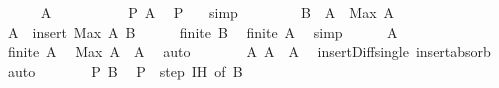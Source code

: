 \begin{isabellebody}
\ \ \ \ \isamarkupfalse%
\ {\isachardoublequoteopen}A\ {\isacharequal}{\kern0pt}\ {\isacharbraceleft}{\kern0pt}{\isacharbraceright}{\kern0pt}{\isachardoublequoteclose}\ \isanewline
\ \ \ \ \isamarkupfalse%
\ \isamarkupfalse%
\ {\isachardoublequoteopen}P\ A{\isachardoublequoteclose}\ \isamarkupfalse%
\ {\isacartoucheopen}P\ {\isacharbraceleft}{\kern0pt}{\isacharbraceright}{\kern0pt}{\isacartoucheclose}\ \isamarkupfalse%
\ simp\isanewline
\ \ \isamarkupfalse%
\isanewline
\ \ \ \ \isamarkupfalse%
\ {\isacharquery}{\kern0pt}B\ {\isacharequal}{\kern0pt}\ {\isachardoublequoteopen}A\ {\isacharminus}{\kern0pt}\ {\isacharbraceleft}{\kern0pt}Max\ A{\isacharbraceright}{\kern0pt}{\isachardoublequoteclose}\ \isanewline
\ \ \ \ \isamarkupfalse%
\ {\isacharquery}{\kern0pt}A\ {\isacharequal}{\kern0pt}\ {\isachardoublequoteopen}insert\ {\isacharparenleft}{\kern0pt}Max\ A{\isacharparenright}{\kern0pt}\ {\isacharquery}{\kern0pt}B{\isachardoublequoteclose}\isanewline
\ \ \ \ \isamarkupfalse%
\ {\isachardoublequoteopen}finite\ {\isacharquery}{\kern0pt}B{\isachardoublequoteclose}\ \isamarkupfalse%
\ {\isacartoucheopen}finite\ A{\isacartoucheclose}\ \isamarkupfalse%
\ simp\isanewline
\ \ \ \ \isamarkupfalse%
\ {\isachardoublequoteopen}A\ {\isasymnoteq}\ {\isacharbraceleft}{\kern0pt}{\isacharbraceright}{\kern0pt}{\isachardoublequoteclose}\isanewline
\ \ \ \ \isamarkupfalse%
\ {\isacartoucheopen}finite\ A{\isacartoucheclose}\ \isamarkupfalse%
\ {\isachardoublequoteopen}Max\ A\ {\isasymin}\ A{\isachardoublequoteclose}\ \isamarkupfalse%
\ auto\isanewline
\ \ \ \ \isamarkupfalse%
\ \isamarkupfalse%
\ A{\isacharcolon}{\kern0pt}\ {\isachardoublequoteopen}{\isacharquery}{\kern0pt}A\ {\isacharequal}{\kern0pt}\ A{\isachardoublequoteclose}\ \isamarkupfalse%
\ insert{\isacharunderscore}{\kern0pt}Diff{\isacharunderscore}{\kern0pt}single\ insert{\isacharunderscore}{\kern0pt}absorb\ \isamarkupfalse%
\ auto\isanewline
\ \ \ \ \isamarkupfalse%
\ \isamarkupfalse%
\ {\isachardoublequoteopen}P\ {\isacharquery}{\kern0pt}B{\isachardoublequoteclose}\ \isamarkupfalse%
\ {\isacartoucheopen}P\ {\isacharbraceleft}{\kern0pt}{\isacharbraceright}{\kern0pt}{\isacartoucheclose}\ step\ IH\ {\isacharbrackleft}{\kern0pt}of\ {\isacharquery}{\kern0pt}B{\isacharbrackright}{\kern0pt}\ \isamarkupfalse%

\end{isabellebody}
